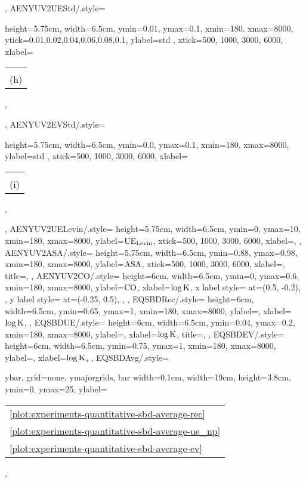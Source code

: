 {{    },
    AENYUV2UEStd/.style={
        height=5.75cm,
        width=6.5cm,
        ymin=0.01,
        ymax=0.1,
        xmin=180,
        xmax=8000,
        ytick={0.01,0.02,0.04,0.06,0.08,0.1},
        ylabel=std \UE,
        xtick={500, 1000, 3000, 6000},
        xlabel=\begin{tabular}{c}\K\\(h)\end{tabular},
    },
    AENYUV2EVStd/.style={
        height=5.75cm,
        width=6.5cm,
        ymin=0.0,
        ymax=0.1,
        xmin=180,
        xmax=8000,
        ylabel=std \EV,
        xtick={500, 1000, 3000, 6000},
        xlabel=\begin{tabular}{c}\K\\(i)\end{tabular},
    },
    AENYUV2UELevin/.style={
        height=5.75cm,
        width=6.5cm,
        ymin=0,
        ymax=10,
        xmin=180,
        xmax=8000,
        ylabel=$\UEL$,
        xtick={500, 1000, 3000, 6000},
        xlabel=\K,
    },
    AENYUV2ASA/.style={
        height=5.75cm,
        width=6.5cm,
        ymin=0.88,
        ymax=0.98,
        xmin=180,
        xmax=8000,
        ylabel=$\text{ASA}$,
        xtick={500, 1000, 3000, 6000},
        xlabel=\K,
        title=\NYU,
    },
    AENYUV2CO/.style={
        height=6cm,
        width=6.5cm,
        ymin=0,
        ymax=0.6,
        xmin=180,
        xmax=8000,
        ylabel=$\text{CO}$,
        xlabel=$\log\text{K}$,
        x label style={
    		at={(0.5, -0.2)},
        },
        y label style={
    		at={(-0.25, 0.5)},
        },
    },
    EQSBDRec/.style={
        height=6cm,
        width=6.5cm,
        ymin=0.65,
        ymax=1,
        xmin=180,
        xmax=8000,
        ylabel=\Rec,
        xlabel=$\log\text{K}$,
    },
    EQSBDUE/.style={
        height=6cm,
        width=6.5cm,
        ymin=0.04,
        ymax=0.2,
        xmin=180,
        xmax=8000,
        ylabel=\UE,
        xlabel=$\log\text{K}$,
        title=\SBD,
    },
    EQSBDEV/.style={
        height=6cm,
        width=6.5cm,
        ymin=0.75,
        ymax=1,
        xmin=180,
        xmax=8000,
        ylabel=\EV,
        xlabel=$\log\text{K}$,
    },
    EQSBDAvg/.style={
        ybar,
        grid=none,
        ymajorgrids,
		bar width=0.1cm,
		width=19cm,
		height=3.8cm,
		ymin=0,
		ymax=25,
		ylabel=\begin{tabular}{l}\ref{plot:experiments-quantitative-sbd-average-rec} \ARec\\\ref{plot:experiments-quantitative-sbd-average-ue_np} \AUE\\\ref{plot:experiments-quantitative-sbd-average-ev} \AEV\end{tabular},
}}
